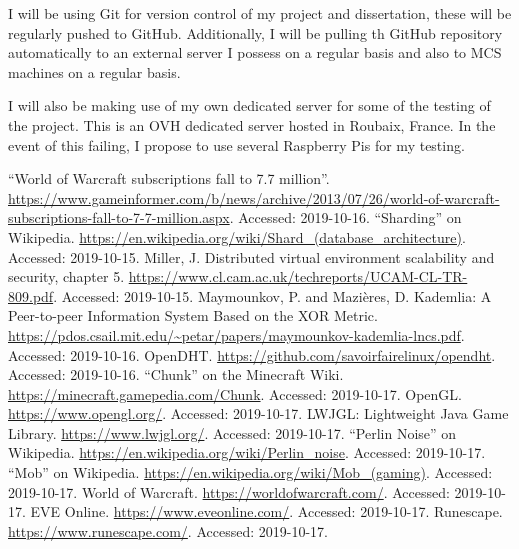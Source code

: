 \documentclass[12pt,a4paper]{article}
\begin{document}
	I will be using Git for version control of my project and dissertation, these will be regularly pushed to GitHub. Additionally, I will be pulling th GitHub repository automatically to an external server I possess on a regular basis and also to MCS machines on a regular basis.
	
	I will also be making use of my own dedicated server for some of the testing of the project. This is an OVH dedicated server hosted in Roubaix, France. In the event of this failing, I propose to use several Raspberry Pis for my testing.
	
	\begin{thebibliography}{9}
		 ``World of Warcraft subscriptions fall to 7.7 million''. \url{https://www.gameinformer.com/b/news/archive/2013/07/26/world-of-warcraft-subscriptions-fall-to-7-7-million.aspx}. Accessed: 2019-10-16.
		 ``Sharding'' on Wikipedia. \url{https://en.wikipedia.org/wiki/Shard_(database_architecture)}. Accessed: 2019-10-15.
		 Miller, J. Distributed virtual environment
		scalability and security, chapter 5. \url{https://www.cl.cam.ac.uk/techreports/UCAM-CL-TR-809.pdf}. Accessed: 2019-10-15.
		 Maymounkov, P. and Mazières, D. Kademlia: A Peer-to-peer Information System Based on the XOR Metric. \url{https://pdos.csail.mit.edu/~petar/papers/maymounkov-kademlia-lncs.pdf}. Accessed: 2019-10-16.
		 OpenDHT. \url{https://github.com/savoirfairelinux/opendht}. Accessed: 2019-10-16.
		 ``Chunk'' on the Minecraft Wiki. \url{https://minecraft.gamepedia.com/Chunk}. Accessed: 2019-10-17.
		 OpenGL. \url{https://www.opengl.org/}. Accessed: 2019-10-17.
		 LWJGL: Lightweight Java Game Library. \url{https://www.lwjgl.org/}. Accessed: 2019-10-17.
		 ``Perlin Noise'' on Wikipedia. \url{https://en.wikipedia.org/wiki/Perlin_noise}. Accessed: 2019-10-17.
		 ``Mob'' on Wikipedia. \url{https://en.wikipedia.org/wiki/Mob_(gaming)}. Accessed: 2019-10-17.
		 World of Warcraft. \url{https://worldofwarcraft.com/}. Accessed: 2019-10-17.
		 EVE Online. \url{https://www.eveonline.com/}. Accessed: 2019-10-17.
		 Runescape. \url{https://www.runescape.com/}. Accessed: 2019-10-17.
	\end{thebibliography}
\end{document}
